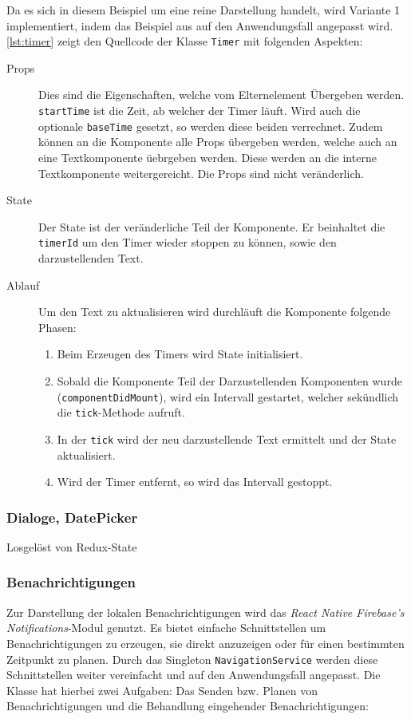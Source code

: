 Da es sich in diesem Beispiel um eine reine Darstellung handelt,
wird Variante 1 implementiert, indem das Beispiel aus \cite{Timersin85:online} auf den Anwendungsfall angepasst wird.
\autoref{lst:timer} zeigt den Quellcode der Klasse \texttt{Timer} mit folgenden Aspekten:
\begin{description}
    \item[Props] Dies sind die Eigenschaften, welche vom Elternelement Übergeben werden.
    \texttt{startTime} ist die Zeit, ab welcher der Timer läuft.
    Wird auch die optionale \texttt{baseTime} gesetzt, so werden diese beiden verrechnet.
    Zudem können an die Komponente alle Props übergeben werden, welche auch an eine Textkomponente üebrgeben werden.
    Diese werden an die interne Textkomponente weitergereicht.
    Die Props sind nicht veränderlich.
    \item[State] Der State ist der veränderliche Teil der Komponente.
    Er beinhaltet die \texttt{timerId} um den Timer wieder stoppen zu können,
    sowie den darzustellenden Text.
    \item[Ablauf]
    Um den Text zu aktualisieren wird durchläuft die Komponente folgende Phasen:
    \begin{enumerate}
        \item Beim Erzeugen des Timers wird State initialisiert.
        \item Sobald die Komponente Teil der Darzustellenden Komponenten wurde (\texttt{componentDidMount}),
        wird ein Intervall gestartet, welcher sekündlich die \texttt{tick}-Methode aufruft.
        \item In der \texttt{tick} wird der neu darzustellende Text ermittelt und der State aktualisiert.
        \item Wird der Timer entfernt, so wird das Intervall gestoppt.
    \end{enumerate}
\end{description}




\subsubsection{Dialoge, DatePicker}
Losgelöst von Redux-State

\subsubsection{Benachrichtigungen}
Zur Darstellung der lokalen Benachrichtigungen wird das \emph{React Native Firebase's Notifications}-Modul genutzt.
Es bietet einfache Schnittstellen um Benachrichtigungen zu erzeugen,
sie direkt anzuzeigen oder für einen bestimmten Zeitpunkt zu planen.
Durch das Singleton \texttt{NavigationService} werden diese Schnittstellen weiter vereinfacht und auf den Anwendungsfall angepasst.
Die Klasse hat hierbei zwei Aufgaben: Das Senden bzw. Planen von Benachrichtigungen und die Behandlung eingehender Benachrichtigungen:

